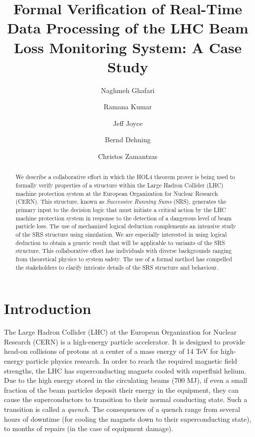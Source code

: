 \documentclass{llncs}
\begin{document}
\thispagestyle{empty}
\title{Formal Verification of Real-Time Data Processing of the LHC Beam Loss Monitoring System: A Case Study}
\author{Naghmeh Ghafari  \and Ramana Kumar  \and Jeff Joyce 
  \and Bernd Dehning  \and Christos Zamantzas  }

\pagestyle{plain}

\maketitle

\begin{abstract}

We describe a collaborative effort in which the HOL4 theorem prover is being used to formally verify properties of a structure within the Large Hadron Collider (LHC) machine protection system at the European Organization for Nuclear Research (CERN).
This structure, known as \emph{Successive Running Sums} (SRS), generates the primary input to the decision logic that must initiate a critical action by the LHC machine protection system in response to the detection of a dangerous level of beam particle loss.
The use of mechanized logical deduction complements an intensive study of the SRS structure using simulation.
We are especially interested in using logical deduction to obtain a generic result that will be applicable to variants of the SRS structure.
This collaborative effort has individuals with diverse backgrounds ranging from theoretical physics to system safety.
The use of a formal method has compelled the stakeholders to clarify intricate details of the SRS structure and behaviour.
\end{abstract}

\section{Introduction}

The Large Hadron Collider (LHC) at the European Organization for Nuclear Research (CERN) is a high-energy particle accelerator.
It is designed to provide head-on collisions of protons at a center of a mass energy of 14 TeV for high-energy particle physics research.
In order to reach the required magnetic field strengths, the LHC has superconducting magnets cooled with superfluid helium.
Due to the high energy stored in the circulating beams (700 MJ), if even a small fraction of the beam particles deposit their energy in the equipment, they can cause the superconductors to transition to their normal conducting state.
Such a transition is called a \emph{quench}.
The consequences of a quench range from several hours of downtime (for cooling the magnets down to their superconducting state), to months of repairs (in the case of equipment damage).
\end{document}
